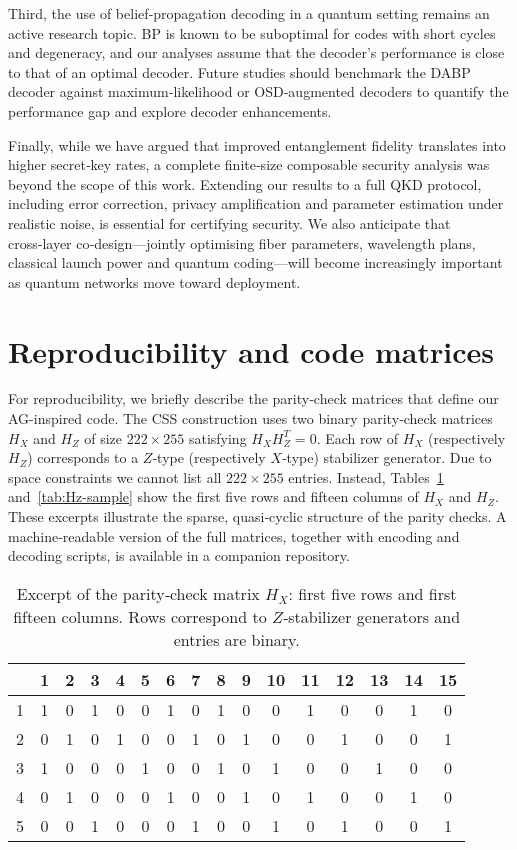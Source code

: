 \documentclass[conference]{IEEEtran}  %
\begin{document}
Third, the use of belief‑propagation decoding in a quantum setting remains an active research topic.  BP is known to be suboptimal for codes with short cycles and degeneracy, and our analyses assume that the decoder’s performance is close to that of an optimal decoder.  Future studies should benchmark the DABP decoder against maximum‑likelihood or OSD‑augmented decoders to quantify the performance gap and explore decoder enhancements.

Finally, while we have argued that improved entanglement fidelity translates into higher secret‑key rates, a complete finite‑size composable security analysis was beyond the scope of this work.  Extending our results to a full QKD protocol, including error correction, privacy amplification and parameter estimation under realistic noise, is essential for certifying security.  We also anticipate that cross‑layer co‑design—jointly optimising fiber parameters, wavelength plans, classical launch power and quantum coding—will become increasingly important as quantum networks move toward deployment.

\appendix

\section{Reproducibility and code matrices}
For reproducibility, we briefly describe the parity‑check matrices that define our AG-inspired code.  The CSS construction uses two binary parity‑check matrices $H_X$ and $H_Z$ of size $222\times 255$ satisfying $H_X H_Z^T = 0$.  Each row of $H_X$ (respectively $H_Z$) corresponds to a $Z$‑type (respectively $X$‑type) stabilizer generator.  Due to space constraints we cannot list all $222\times 255$ entries.  Instead, Tables~\ref{tab:Hx-sample} and~\ref{tab:Hz-sample} show the first five rows and fifteen columns of $H_X$ and $H_Z$.  These excerpts illustrate the sparse, quasi‑cyclic structure of the parity checks.  A machine‑readable version of the full matrices, together with encoding and decoding scripts, is available in a companion repository.

\begin{table}[h]
\centering
\caption{Excerpt of the parity‑check matrix $H_X$: first five rows and first fifteen columns.  Rows correspond to $Z$‑stabilizer generators and entries are binary.}
\label{tab:Hx-sample}
\begin{tabular}{cccccccccccccccc}
\hline
 & 1 & 2 & 3 & 4 & 5 & 6 & 7 & 8 & 9 & 10 & 11 & 12 & 13 & 14 & 15 \\
\hline
1 & 1 & 0 & 1 & 0 & 0 & 1 & 0 & 1 & 0 & 0 & 1 & 0 & 0 & 1 & 0 \\
2 & 0 & 1 & 0 & 1 & 0 & 0 & 1 & 0 & 1 & 0 & 0 & 1 & 0 & 0 & 1 \\
3 & 1 & 0 & 0 & 0 & 1 & 0 & 0 & 1 & 0 & 1 & 0 & 0 & 1 & 0 & 0 \\
4 & 0 & 1 & 0 & 0 & 0 & 1 & 0 & 0 & 1 & 0 & 1 & 0 & 0 & 1 & 0 \\
5 & 0 & 0 & 1 & 0 & 0 & 0 & 1 & 0 & 0 & 1 & 0 & 1 & 0 & 0 & 1 \\
\hline
\end{tabular}
\end{table}
\end{document}
